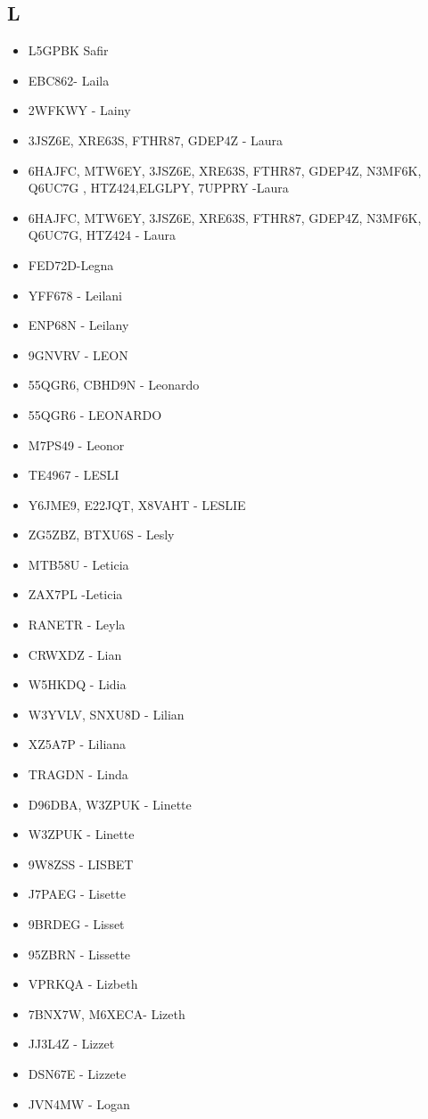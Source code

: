 \subsection*{L}
\begin{itemize}[leftmargin=*,nosep]
\item L5GPBK Safir
\item EBC862- Laila
\item 2WFKWY - Lainy
\item 3JSZ6E, XRE63S, FTHR87, GDEP4Z - Laura
\item 6HAJFC, MTW6EY, 3JSZ6E, XRE63S, FTHR87, GDEP4Z, N3MF6K, Q6UC7G , HTZ424,ELGLPY, 7UPPRY -Laura
\item 6HAJFC, MTW6EY, 3JSZ6E, XRE63S, FTHR87, GDEP4Z, N3MF6K, Q6UC7G, HTZ424 - Laura
\item FED72D-Legna
\item YFF678 - Leilani
\item ENP68N - Leilany
\item 9GNVRV - LEON
\item 55QGR6, CBHD9N - Leonardo
\item 55QGR6 - LEONARDO
\item M7PS49 - Leonor
\item TE4967 - LESLI
\item Y6JME9, E22JQT, X8VAHT -  LESLIE
\item ZG5ZBZ, BTXU6S - Lesly
\item MTB58U - Leticia
\item ZAX7PL -Leticia
\item RANETR - Leyla
\item CRWXDZ - Lian
\item W5HKDQ - Lidia
\item W3YVLV, SNXU8D - Lilian
\item XZ5A7P - Liliana
\item TRAGDN - Linda
\item D96DBA, W3ZPUK - Linette
\item W3ZPUK - Linette
\item 9W8ZSS - LISBET
\item J7PAEG - Lisette
\item 9BRDEG - Lisset
\item 95ZBRN - Lissette
\item VPRKQA - Lizbeth
\item 7BNX7W, M6XECA- Lizeth
\item JJ3L4Z - Lizzet
\item DSN67E - Lizzete
\item JVN4MW - Logan

\end{itemize}

